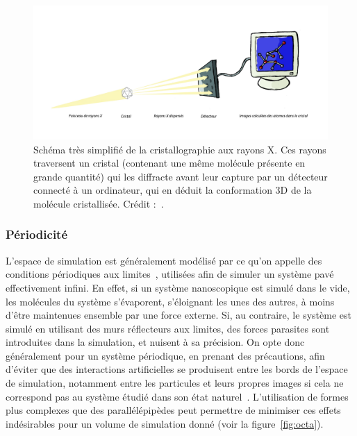 	\begin{figure}[!htbp]
		\centering
		\includegraphics[width=\textwidth]{figures/ch1/crystal}
		\caption[Schéma très simplifié de la cristallographie aux rayons X]{Schéma très simplifié de la cristallographie aux rayons X. Ces rayons traversent un cristal (contenant une même molécule présente en grande quantité) qui les diffracte avant leur capture par un détecteur connecté à un ordinateur, qui en déduit la conformation 3D de la molécule cristallisée. Crédit :~\cite{trellet2015exploration}.}
		\label{fig:crystal}
	\end{figure}
	
	\subsubsection{Périodicité}
	L'espace de simulation est généralement modélisé par ce qu'on appelle des conditions périodiques aux limites~\cite{cheatham1995molecular}, utilisées afin de simuler un système pavé effectivement infini. En effet, si un système nanoscopique est simulé dans le vide, les molécules du système s'évaporent, s'éloignant les unes des autres, à moins d'être maintenues ensemble par une force externe. Si, au contraire, le système est simulé en utilisant des murs réflecteurs aux limites, des forces parasites sont introduites dans la simulation, et nuisent à sa précision. On opte donc généralement pour un système périodique, en prenant des précautions, afin d'éviter que des interactions \og artificielles \fg{} se produisent entre les \og bords \fg{} de l'espace de simulation, notamment entre les particules et leurs propres images si cela ne correspond pas au système étudié dans son état naturel~\cite{de1997effect}. L'utilisation de formes plus complexes que des parallélépipèdes peut permettre de minimiser ces effets indésirables pour un volume de simulation donné (voir la figure~\ref{fig:octa}).
	

